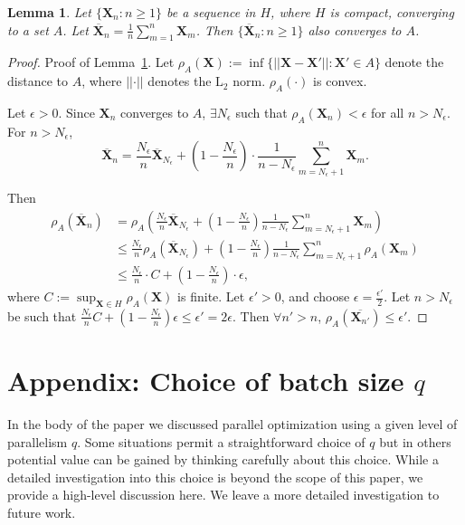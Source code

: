 \documentclass[paper=letter]{scrartcl}
\newtheorem{lemma}{Lemma}
\begin{document}
\begin{lemma} \label{lemma:polyak-ruppert}
Let $\{\bm{X}_n: n \geq 1\}$ be a sequence in $H$, where $H$ is compact, converging to a set $A$. Let $\overline{\bm{X}}_n = \frac{1}{n} \sum_{m=1}^n \bm{X}_m$. 
Then $\{\overline{\bm{X}}_n : n\geq 1\}$ also converges to $A$.
\end{lemma}
\begin{proof}{Proof of Lemma~\ref{lemma:polyak-ruppert}.} 
Let $\rho_A(\bm{X}) := \inf\{ \lvert\lvert \bm{X} - \bm{X'} \rvert\rvert : \bm{X}' \in A\}$ denote the distance to $A$,
where $\lvert\lvert \cdot \rvert\rvert$ denotes the $\mathrm{L}_2$ norm. $\rho_A(\cdot)$ is convex.

Let $\epsilon >0$.
Since $\bm{X}_n$ converges to $A$, $\exists N_{\epsilon}$ such that  $\rho_A(\bm{X}_n) < \epsilon$ 
for all $n > N_{\epsilon}$.  For $n > N_\epsilon$,
\begin{equation*}
     \overline{\bm{X}}_n = \frac{N_{\epsilon}}{n} \overline{\bm{X}}_{N_{\epsilon}} +
     \left(1-\frac{N_{\epsilon}}{n}\right) \cdot \frac{1}{n-N_{\epsilon}} \sum_{m=N_{\epsilon}+1}^{n} \bm{X}_m.
\end{equation*}

Then
\begin{equation}
\begin{split}
\rho_A(\overline{\bm{X}}_n)
&= 
\rho_A\left(
\frac{N_{\epsilon}}{n} \overline{\bm{X}}_{N_{\epsilon}} +
\left(1-\frac{N_{\epsilon}}{n}\right)
\frac1{n-N_\epsilon}\sum_{m=N_{\epsilon}+1}^{n}\bm{X}_m \right) \\
    &\le \frac{N_{\epsilon}}{n}
    \rho_A(\overline{\bm{X}}_{N_{\epsilon}})  +
    \left(1-\frac{N_{\epsilon}}{n}\right) \frac{1}{n-N_{\epsilon}} \sum_{m=N_{\epsilon}+1}^{n}\rho_A\left(\bm{X}_m \right) \\
    &\leq \frac{N_{\epsilon}}{n} \cdot C + \left(1-\frac{N_{\epsilon}}{n}\right) \cdot \epsilon,
\end{split}
\end{equation}
where $C := \sup_{\bm{X} \in H} \rho_A(\bm{X})$ is finite. Let $\epsilon'>0$, and choose $\epsilon = \frac{\epsilon'}{2}$.
Let $n>N_\epsilon$ be such that $\frac{N_{\epsilon}}{n}C + (1-\frac{N_{\epsilon}}{n}) \epsilon \leq \epsilon' = 2\epsilon$. Then $\forall n' > n$, $\rho_A(\overline{\bm{X}_{n'}}) \leq \epsilon'$. 
\end{proof}


\section*{Appendix: Choice of batch size $q$}\label{sec:choice-of-q}
In the body of the paper we discussed parallel optimization using a given level of parallelism $q$.   Some situations permit a straightforward choice of $q$ but in others potential value can be gained by thinking carefully about this choice.  While a detailed investigation into this choice is beyond the scope of this paper, we provide a high-level discussion here.  We leave a more detailed investigation to future work.
\end{document}
